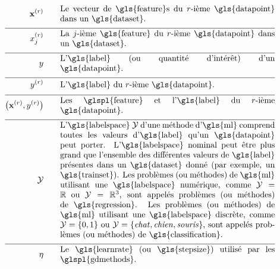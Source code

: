 \begin{align}
	\featurevec^{(\sampleidx)} \quad\quad &\parbox{.75\textwidth}{Le vecteur de \gls{feature}s du $\sampleidx$-ième \gls{datapoint} dans un \gls{dataset}. } \nonumber \\[2mm] \hline \nonumber\\[-5mm]
	\feature_{\featureidx}^{(\sampleidx)}\quad\quad &\parbox{.75\textwidth}{La $\featureidx$-ième \gls{feature} du $\sampleidx$-ième 
		\gls{datapoint} dans un \gls{dataset}.} \nonumber  \\[2mm] \hline \nonumber\\[-5mm]
	\truelabel \quad\quad &\parbox{.75\textwidth}{L'\gls{label} (ou quantité d’intérêt) d’un \gls{datapoint}.} \nonumber \\[2mm] \hline \nonumber\\[-5mm]
	\truelabel^{(\sampleidx)} \quad\quad &\parbox{.75\textwidth}{L'\gls{label} du $\sampleidx$-ième \gls{datapoint}.} \nonumber \\[2mm] \hline \nonumber\\[-5mm]
	\big(\featurevec^{(\sampleidx)},\truelabel^{(\sampleidx)}\big)  \quad\quad &\parbox{.75\textwidth}{Les \glspl{feature} et l'\gls{label} du $\sampleidx$-ième \gls{datapoint}.}\nonumber \\[2mm] \hline \nonumber\\[-5mm]
	\labelspace  \quad\quad & \parbox{.75\textwidth}{L’\gls{labelspace} $\labelspace$ d’une méthode d’\gls{ml} comprend toutes les valeurs d'\gls{label} qu’un \gls{datapoint} peut porter. L’\gls{labelspace} nominal peut être plus grand que l’ensemble des différentes valeurs de \gls{label} présentes dans un \gls{dataset} donné (par exemple, un \gls{trainset}). Les problèmes (ou méthodes) de \gls{ml} utilisant une \gls{labelspace} numérique, comme $\labelspace=\mathbb{R}$ ou $\labelspace=\mathbb{R}^{3}$, sont appelés problèmes (ou méthodes) de \gls{regression}. Les problèmes (ou méthodes) de \gls{ml} utilisant une \gls{labelspace} discrète, comme $\labelspace=\{0,1\}$ ou $\labelspace=\{\mbox{\emph{chat}},\mbox{\emph{chien}},\mbox{\emph{souris}}\}$, sont appelés problèmes (ou méthodes) de \gls{classification}.}  \nonumber \\[2mm] \hline \nonumber\\[-5mm]
	\lrate  \quad\quad & \parbox{.75\textwidth}{Le \gls{learnrate} (ou \gls{stepsize}) utilisé par les \glspl{gdmethods}.}  \nonumber
\end{align}
                  


